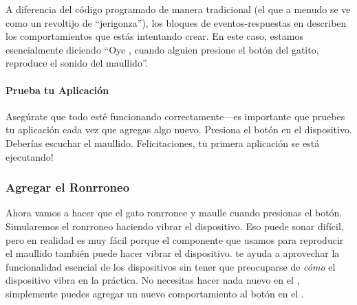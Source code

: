 \documentclass[letterpaper]{article}
\begin{document}
A diferencia del código programado de manera tradicional (el que a
menudo se ve como un revoltijo de ``jerigonza''), los bloques de
eventos-respuestas en \AppInventor describen los comportamientos que
estás intentando crear. En este caso, estamos esencialmente diciendo
``Oye \AppInventor, cuando alguien presione el botón del gatito,
reproduce el sonido del maullido''.

\paragraph{Prueba tu Aplicación} Asegúrate que todo esté funcionando
correctamente---es importante que pruebes tu aplicación cada vez que
agregas algo nuevo. Presiona el botón en el dispositivo. Deberías
escuchar el maullido. Felicitaciones, tu primera aplicación se está
ejecutando!

\subsubsection*{Agregar el Ronrroneo}
Ahora vamos a hacer que el gato ronrronee y maulle cuando presionas el
botón. Simularemos el ronrroneo haciendo vibrar el dispositivo. Eso
puede sonar difícil, pero en realidad es muy fácil porque el
componente  que usamos para reproducir el maullido
también puede hacer vibrar el dispositivo. \AppInventor te ayuda a
aprovechar la funcionalidad esencial de los dispositivos sin tener que
preocuparse de \emph{cómo} el dispositivo vibra en la práctica. No
necesitas hacer nada nuevo en el \designer, simplemente puedes agregar
un nuevo comportamiento al botón en el \blockEditor.
\end{document}
